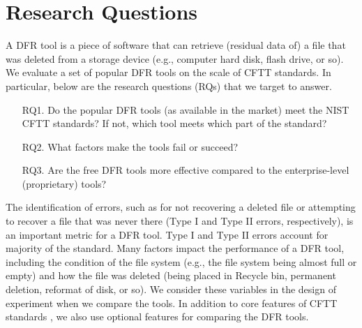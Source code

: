 \section{Research Questions}

A DFR tool is a piece of software that can retrieve (residual data of) a file that was deleted 
from a storage device (e.g., computer hard disk, flash drive, or so). We evaluate a set of 
popular DFR tools on the scale of CFTT standards. 
In particular, below are the research questions (RQs) that we target to answer. 

\begin{itemize}
\item[RQ1.] Do the popular DFR tools (as available in the market) meet the NIST CFTT standards? 
If not, which tool meets which part of the standard? 

\item[RQ2.] What factors make the tools fail or succeed?

\item[RQ3.] Are the free DFR tools more effective compared to the enterprise-level (proprietary) tools?
\end{itemize}

The identification of errors, such as for not recovering a deleted file or attempting to recover a file that was never there 
(Type I and Type II errors, respectively), is an important metric for a DFR tool. 
Type I and Type II errors account for majority of the standard. Many factors impact the performance of a DFR tool, 
including the condition of the file system (e.g., the file system being almost full or empty) and 
how the file was deleted (being placed in Recycle bin, permanent deletion, reformat of disk, or so). 
We consider these variables in the design of experiment when we compare the tools. 
In addition to core features of CFTT standards \cite{cftt:nist}, we also use optional features \cite{cftt:nist} for comparing the DFR tools.


